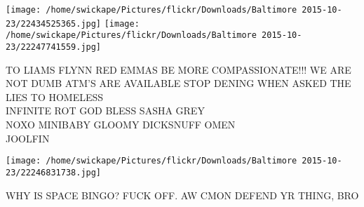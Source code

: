 \documentclass[10pt,letterpaper]{article}
\begin{document}
\texttt{[image: /home/swickape/Pictures/flickr/Downloads/Baltimore 2015-10-23/22434525365.jpg]}
\texttt{[image: /home/swickape/Pictures/flickr/Downloads/Baltimore 2015-10-23/22247741559.jpg]}

TO LIAMS FLYNN RED EMMAS BE MORE COMPASSIONATE!!! WE ARE NOT DUMB ATM'S ARE AVAILABLE STOP DENING WHEN ASKED THE LIES TO HOMELESS\\
INFINITE ROT GOD BLESS SASHA GREY\\
NOXO MINIBABY GLOOMY DICKSNUFF OMEN\\
JOOLFIN\\
\pagebreak

\texttt{[image: /home/swickape/Pictures/flickr/Downloads/Baltimore 2015-10-23/22246831738.jpg]}

WHY IS SPACE BINGO?  FUCK OFF.  AW CMON DEFEND YR THING, BRO\\
\pagebreak
\end{document}
